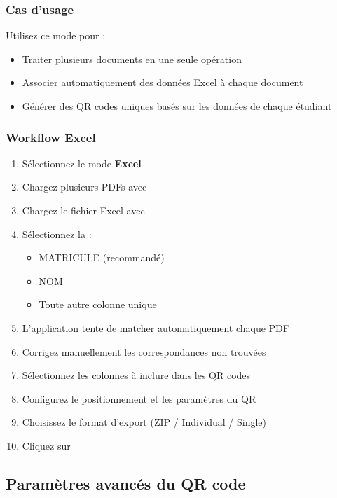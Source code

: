 \subsubsection{Cas d'usage}

Utilisez ce mode pour :
\begin{itemize}[leftmargin=*]
    \item Traiter plusieurs documents en une seule opération
    \item Associer automatiquement des données Excel à chaque document
    \item Générer des QR codes uniques basés sur les données de chaque étudiant
\end{itemize}

\subsubsection{Workflow Excel}

\begin{enumerate}[leftmargin=*]
    \item Sélectionnez le mode \textbf{Excel}
    \item Chargez plusieurs PDFs avec 
    \item Chargez le fichier Excel avec 
    \item Sélectionnez la  :
    \begin{itemize}
        \item MATRICULE (recommandé)
        \item NOM
        \item Toute autre colonne unique
    \end{itemize}
    \item L'application tente de matcher automatiquement chaque PDF
    \item Corrigez manuellement les correspondances non trouvées
    \item Sélectionnez les colonnes à inclure dans les QR codes
    \item Configurez le positionnement et les paramètres du QR
    \item Choisissez le format d'export (ZIP / Individual / Single)
    \item Cliquez sur 
\end{enumerate}

\subsection{Paramètres avancés du QR code}

